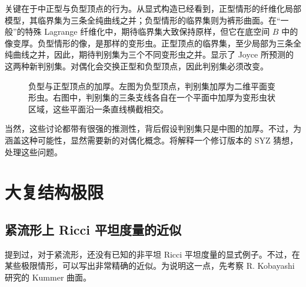 关键在于中正型与负型顶点的行为。从显式构造已经看到，正型情形的纤维化局部模型，其临界集为三条全纯曲线之并；负型情形的临界集则为裤形曲面。在“一般”的特殊 Lagrange 纤维化中，期待临界集大致保持原样，但它在底空间 $B$ 中的像变厚。负型情形的像，是那样的变形虫。正型顶点的临界集，至少局部为三条全纯曲线之并，因此，期待判别集为三个不同变形虫之并。显示了 Joyce 所预测的这两种新判别集。对偶化会交换正型和负型顶点，因此判别集必须改变。
\begin{figure}[H]
\centering
{}
\caption{负型与正型顶点的加厚。左图为负型顶点，判别集加厚为二维平面变形虫。右图中，判别集的三条支线各自在一个平面中加厚为变形虫状区域，这些平面沿一条直线横截相交。}\label{fig:7.9}
\end{figure}

当然，这些讨论都带有很强的推测性，背后假设判别集只是中图的加厚。不过，为涵盖这种可能性，显然需要新的对偶化概念。将解释一个修订版本的 SYZ 猜想，处理这些问题。

\section{大复结构极限}\label{sec:7.3}
\subsection{紧流形上 Ricci 平坦度量的近似}\label{sec:7.3.1}

提到过，对于紧流形，还没有已知的非平坦 Ricci 平坦度量的显式例子。不过，在某些极限情形，可以写出非常精确的近似。为说明这一点，先考察 R. Kobayashi研究的 Kummer 曲面。

